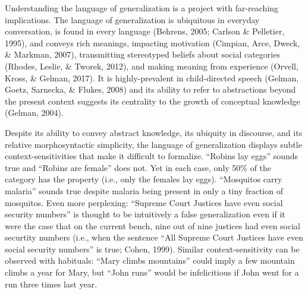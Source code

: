 \documentclass[english,,man,floatsintext]{apa6}
\theoremstyle{definition}
\theoremstyle{definition}
\theoremstyle{definition}
\theoremstyle{remark}
\begin{document}
Understanding the language of generalization is a project with
far-reaching implications. The language of generalization is ubiquitous
in everyday conversation, is found in every language (Behrens, 2005;
Carlson \& Pelletier, 1995), and conveys rich meanings, impacting
motivation (Cimpian, Arce, Dweck, \& Markman, 2007), transmitting
stereotyped beliefs about social categories (Rhodes, Leslie, \& Tworek,
2012), and making meaning from experience (Orvell, Kross, \& Gelman,
2017). It is highly-prevalent in child-directed speech (Gelman, Goetz,
Sarnecka, \& Flukes, 2008) and its ability to refer to abstractions
beyond the present context suggests its centrality to the growth of
conceptual knowledge (Gelman, 2004).

Despite its ability to convey abstract knowledge, its ubiquity in
discourse, and its relative morphosyntactic simplicity, the language of
generalization displays subtle context-sensitivities that make it
difficult to formalize. \enquote{Robins lay eggs} sounds true and
\enquote{Robins are female} does not. Yet in each case, only 50\% of the
category has the property (i.e., only the females lay eggs).
\enquote{Mosquitos carry malaria} sounds true despite malaria being
present in only a tiny fraction of mosquitos. Even more perplexing:
\enquote{Supreme Court Justices have even social security numbers} is
thought to be intuitively a false generalization even if it were the
case that on the current bench, nine out of nine justices had even
social securtity numbers (i.e., when the sentence ``All Supreme Court
Justices have even social security numbers'' is true; Cohen, 1999).
Similar context-sensitivity can be observed with habituals:
\enquote{Mary climbs mountains} could imply a few mountain climbs a year
for Mary, but \enquote{John runs} would be infelicitious if John went
for a run three times last year.
\end{document}
